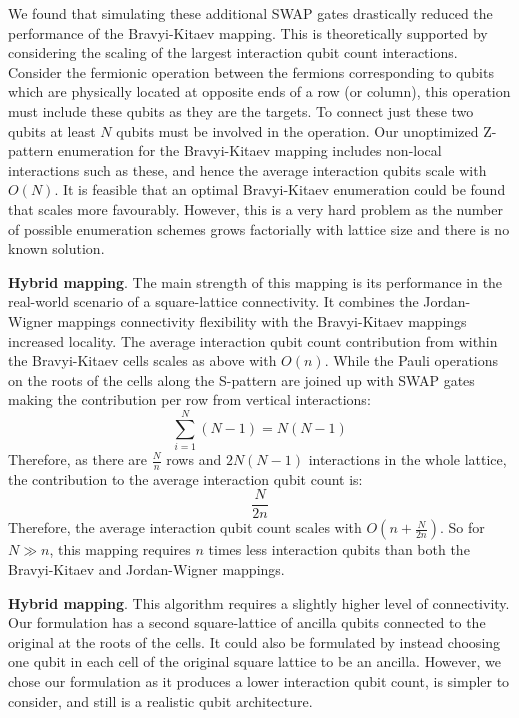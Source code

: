 \documentclass[pdftex,pra,aps,twocolumn,twoside]{revtex4-1}
\theoremstyle{plain}
\theoremstyle{note}
\newcommand\+{{\footnotesize \raisebox{0.3ex}{+}}}
\begin{document}
We found that simulating these additional SWAP gates drastically reduced the performance of the Bravyi-Kitaev mapping. This is theoretically supported by considering the scaling of the largest interaction qubit count interactions. Consider the fermionic operation between the fermions corresponding to qubits which are physically located at opposite ends of a row (or column), this operation must include these qubits as they are the targets. To connect just these two qubits at least $N$ qubits must be involved in the operation. Our unoptimized Z-pattern enumeration for the Bravyi-Kitaev mapping includes non-local interactions such as these, and hence the average interaction qubits scale with $O(N)$. It is feasible that an optimal Bravyi-Kitaev enumeration could be found that scales more favourably. However, this is a very hard problem as the number of possible enumeration schemes grows factorially with lattice size and there is no known solution.

\textbf {Hybrid mapping}.
The main strength of this mapping is its performance in the real-world scenario of a square-lattice connectivity. It combines the Jordan-Wigner mappings connectivity flexibility with the Bravyi-Kitaev mappings increased locality. The average interaction qubit count contribution from within the Bravyi-Kitaev cells scales as above with $O(n)$. While the Pauli operations on the roots of the cells along the S-pattern are joined up with SWAP gates making the contribution per row from vertical interactions:
\begin{equation}
        \sum_{i=1}^{N} (N-1) = N(N-1)
\end{equation}
Therefore, as there are $\frac{N}{n}$ rows and $2N(N-1)$ interactions in the whole lattice, the contribution to the average interaction qubit count is:
\begin{equation}
     \frac{N}{2n}
\end{equation}
Therefore, the average interaction qubit count scales with $O(n + \frac{N}{2n})$. So for $N \gg n$, this mapping requires $n$ times less interaction qubits than both the Bravyi-Kitaev and Jordan-Wigner mappings.

\textbf {Hybrid\+ mapping}.
This algorithm requires a slightly higher level of connectivity. Our formulation has a second square-lattice of ancilla qubits connected to the original at the roots of the cells. It could also be formulated by instead choosing one qubit in each cell of the original square lattice to be an ancilla. However, we chose our formulation as it produces a lower interaction qubit count, is simpler to consider, and still is a realistic qubit architecture.
\end{document}
